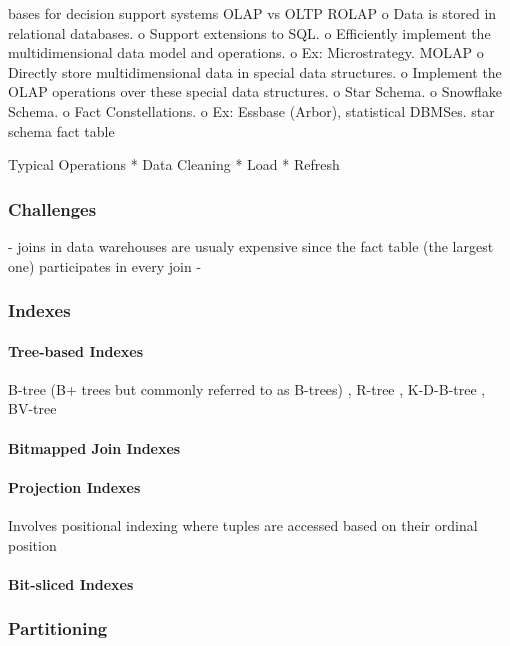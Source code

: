 \documentclass[12pt,a4paper]{article}
\begin{document}
bases for decision support systems \cite{248616}
OLAP vs OLTP
ROLAP
          o Data is stored in relational databases.
          o Support extensions to SQL.
          o Efficiently implement the multidimensional data model and operations.
          o Ex: Microstrategy.
MOLAP
          o Directly store multidimensional data in special data structures.
          o Implement the OLAP operations over these special data structures.
          o Star Schema.
          o Snowflake Schema.
          o Fact Constellations.
          o Ex: Essbase (Arbor), statistical DBMSes.
star schema
fact table

Typical Operations
    * Data Cleaning
    * Load
    * Refresh



\subsubsection*{Challenges}
- joins in data warehouses are usualy expensive since the fact table (the largest one) participates in every join \cite{628286}
- 

\subsubsection*{Indexes}
\paragraph{Tree-based Indexes}
B-tree (B+ trees but commonly referred to as B-trees) \cite{253268}, R-tree \cite{602266}, K-D-B-tree \cite{582321}, BV-tree \cite{223796}

\paragraph{Bitmapped Join Indexes}
\cite{212001}


\paragraph{Projection Indexes}
Involves positional indexing where tuples are accessed based on their ordinal position \cite{628286}

\paragraph{Bit-sliced Indexes}


\subsubsection*{Partitioning}
\end{document}
